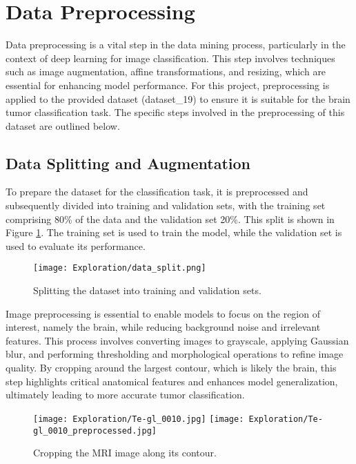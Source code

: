 \section{Data Preprocessing}\label{data_preprocessing}

Data preprocessing is a vital step in the data mining process, particularly in the context of deep learning for image classification. This step involves techniques such as image augmentation, affine transformations, and resizing, which are essential for enhancing model performance. For this project, preprocessing is applied to the provided dataset (dataset\_19) to ensure it is suitable for the brain tumor classification task. The specific steps involved in the preprocessing of this dataset are outlined below.

\subsection{Data Splitting and Augmentation}\label{data_split_augmentation}
To prepare the dataset for the classification task, it is preprocessed and subsequently divided into training and validation sets, with the training set comprising 80\% of the data and the validation set 20\%. This split is shown in Figure \ref{fig:data_split}. The training set is used to train the model, while the validation set is used to evaluate its performance.

\begin{figure}[H]
  \begin{center}
    \texttt{[image: Exploration/data\_split.png]}
  \end{center}
  \caption{Splitting the dataset into training and validation sets.}\label{fig:data_split}
\end{figure}

Image preprocessing is essential to enable models to focus on the region of interest, namely the brain, while reducing background noise and irrelevant features. This process involves converting images to grayscale, applying Gaussian blur, and performing thresholding and morphological operations to refine image quality. By cropping around the largest contour, which is likely the brain, this step highlights critical anatomical features and enhances model generalization, ultimately leading to more accurate tumor classification.

\begin{figure}[H]
  \begin{center}
    \texttt{[image: Exploration/Te-gl\_0010.jpg]}
    \texttt{[image: Exploration/Te-gl\_0010\_preprocessed.jpg]}
  \end{center}
  \caption{Cropping the MRI image along its contour.}\label{fig:image_cropping}
\end{figure}

